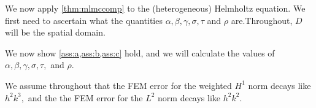We now apply \cref{thm:mlmccomp} to the (heterogeneous) Helmholtz equation. We first need to ascertain what the quantities $\alpha, \beta, \gamma, \sigma, \tau$ and $\rho$ are.Throughout, $D$ will be the spatial domain.

%
%
%
%

We now show \cref{ass:a,ass:b,ass:c} hold, and we will calculate the values of $\alpha, \beta, \gamma, \sigma, \tau,$ and $\rho$.

We assume throughout that the FEM error for the weighted $H^1$ norm decays like $h^2k^3,$ and the the FEM error for the $L^2$ norm decays like $h^2k^2.$


